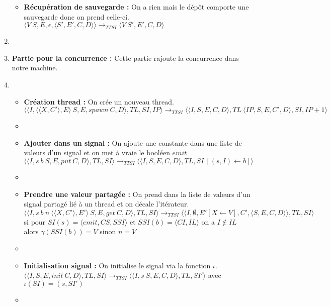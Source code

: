 \documentclass[10pt,a4paper]{report}
\begin{document}
\begin{enumerate}
\begin{itemize}
  \item[] \textbf{Récupération de sauvegarde :}  On a rien mais le dépôt comporte une sauvegarde donc on prend celle-ci.
    \smallbreak  
    $\langle V~S,E,\epsilon,\langle S',E',C,D\rangle\rangle
    \longrightarrow_{TTSI} 
    \langle V~S',E',C,D\rangle$
  \end{itemize}
\item[]
  
  
  
\item[] \textbf{Partie pour la concurrence :} Cette partie rajoute la concurrence dans notre machine. 
\item[]
  \begin{itemize}
  \item[]  \textbf{Création thread :} On crée un nouveau thread.
    \smallbreak 
    $\langle\langle I,\langle\langle X,C'\rangle, E\rangle~S,E,spawn~C,D\rangle,TL,SI,IP\rangle 
    \longrightarrow_{TTSI} 
    \langle\langle I,S,E,C,D\rangle,TL~\langle IP,S,E,C',D\rangle,SI,IP+1\rangle$
  \item[]
    
  \item[] \textbf{Ajouter dans un signal :} On ajoute une constante dans une liste de valeurs d'un signal et on met à vraie le booléen $emit$
    \smallbreak
    $\langle\langle I,s~b~S,E,put~C,D\rangle,TL,SI\rangle
    \longrightarrow_{TTSI} 
    \langle\langle I,S,E,C,D\rangle,TL,SI~[(s,I) \leftarrow b]\rangle$ 
  \item[]
    
  \item[] \textbf{Prendre une valeur partagée :} On prend dans la liste de valeurs d'un signal partagé lié à un thread et on décale l'itérateur.
    \smallbreak
    $\langle\langle I,s~b~n~\langle\langle X,C'\rangle,E'\rangle~S,E,get~C,D\rangle,TL,SI\rangle 
    \longrightarrow_{TTSI} 
    \langle\langle I,\emptyset,E'[X \leftarrow V],C',\langle S,E,C,D\rangle\rangle,TL,SI\rangle$
    \\ si pour $SI(s) = \langle emit,CS,SSI\rangle$ et $SSI(b) = \langle CI,IL\rangle$ on a $I \notin IL$ alors $\gamma(SSI(b)) = V$ sinon $n = V$
  \item[]
    
  \item[] \textbf{Initialisation signal :} On initialise le signal via la fonction $\iota$.
    \smallbreak 
    $\langle\langle I,S,E,init~C,D\rangle,TL,SI\rangle 
    \longrightarrow_{TTSI}
    \langle\langle I,s~S,E,C,D\rangle,TL,SI'\rangle$
    avec $\iota(SI) = (s,SI')$
  \item[]	
    

\end{itemize}
\end{enumerate}
\end{document}
